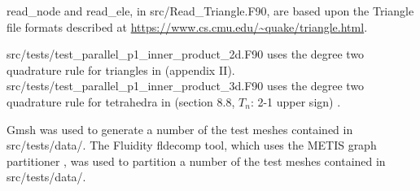 \documentclass{article}
\begin{document}
read\_node and read\_ele, in src/Read\_Triangle.F90, are based upon the
Triangle file formats described at
\url{https://www.cs.cmu.edu/~quake/triangle.html}.

src/tests/test\_parallel\_p1\_inner\_product\_2d.F90 uses the degree two
quadrature rule for triangles in \citet{dunavant1985} (appendix II).
src/tests/test\_parallel\_p1\_inner\_product\_3d.F90 uses the degree two
quadrature rule for tetrahedra in
\citet{stroud1971} (section 8.8, $T_n$: 2-1 upper sign)
\citep[see also][]{hammer1956}.

Gmsh \citep{geuzaine2009} was used to generate a number of the test meshes
contained in src/tests/data/. The Fluidity fldecomp tool, which uses the METIS
graph partitioner \citep{karypis1998}, was used to partition a number of the
test meshes contained in src/tests/data/.



\end{document}
